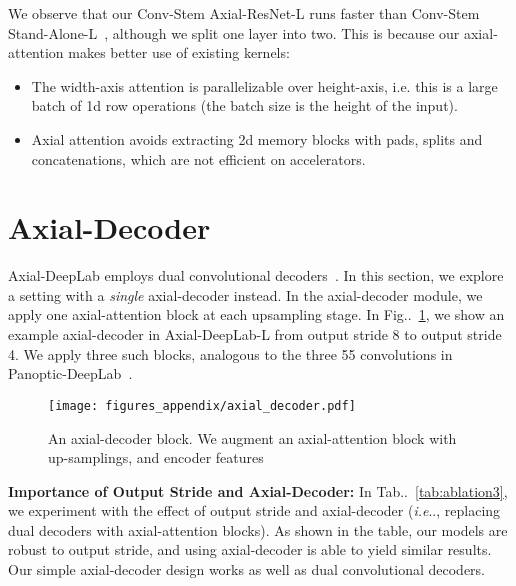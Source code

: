 \documentclass[runningheads]{llncs}
\makeatletter
\DeclareRobustCommand\onedot{\futurelet\@let@token\@onedot}
\def\@onedot{\ifx\@let@token.\else.\null\fi\xspace}
\def\ie{\emph{i.e}\onedot} \def\Ie{\emph{I.e}\onedot}
\newcommand{\figref}[1]{Fig\onedot~\ref{#1}}
\newcommand{\tabref}[1]{Tab\onedot~\ref{#1}}
\makeatother
\begin{document}
\begin{subappendices}
We observe that our Conv-Stem Axial-ResNet-L runs faster than Conv-Stem Stand-Alone-L~\cite{parmar2019stand}, although we split one layer into two. This is because our axial-attention makes better use of existing kernels:
\begin{itemize}
  \item The width-axis attention is parallelizable over height-axis, i.e. this is a large batch of 1d row operations (the batch size is the height of the input).
  \item Axial attention avoids extracting 2d memory blocks with pads, splits and concatenations, which are not efficient on accelerators.
\end{itemize}

\section{Axial-Decoder}
Axial-DeepLab employs dual convolutional decoders~\cite{cheng2019panoptic}. In this section, we explore a setting with a {\it single} axial-decoder instead. In the axial-decoder module, we apply one axial-attention block at each upsampling stage. In \figref{fig:axial_decoder}, we show an example axial-decoder in Axial-DeepLab-L from output stride 8 to output stride 4. We apply three such blocks, analogous to the three 55 convolutions in Panoptic-DeepLab~\cite{cheng2019panoptic}.
\begin{figure}[t]
    \centering
    \texttt{[image: figures\_appendix/axial\_decoder.pdf]}
    \caption{An axial-decoder block. We augment an axial-attention block with up-samplings, and encoder features}
    \label{fig:axial_decoder}
\end{figure}

{\bf Importance of Output Stride and Axial-Decoder:} In \tabref{tab:ablation3}, we experiment with the effect of output stride and axial-decoder (\ie, replacing dual decoders with axial-attention blocks). As shown in the table, our models are robust to output stride, and using axial-decoder is able to yield similar results. Our simple axial-decoder design works as well as dual convolutional decoders.


\end{subappendices}
\end{document}

